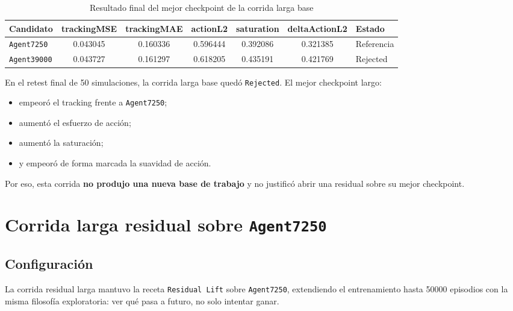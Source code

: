 \documentclass[11pt,a4paper]{article}
\begin{document}
\begin{table}[H]
\centering
\caption{Resultado final del mejor checkpoint de la corrida larga base}
\scriptsize
\begin{tabularx}{\linewidth}{>{\raggedright\arraybackslash}p{1.7cm} c c c c c >{\raggedright\arraybackslash}p{1.8cm}}
\toprule
Candidato & trackingMSE & trackingMAE & actionL2 & saturation & deltaActionL2 & Estado \\
\midrule
\texttt{Agent7250} & 0.043045 & 0.160336 & 0.596444 & 0.392086 & 0.321385 & Referencia \\
\texttt{Agent39000} & 0.043727 & 0.161297 & 0.618205 & 0.435191 & 0.421769 & Rejected \\
\bottomrule
\end{tabularx}
\end{table}

En el retest final de 50 simulaciones, la corrida larga base qued\'o \texttt{Rejected}. El mejor checkpoint largo:
\begin{itemize}
    \item empeor\'o el tracking frente a \texttt{Agent7250};
    \item aument\'o el esfuerzo de acci\'on;
    \item aument\'o la saturaci\'on;
    \item y empeor\'o de forma marcada la suavidad de acci\'on.
\end{itemize}

Por eso, esta corrida \textbf{no produjo una nueva base de trabajo} y no justific\'o abrir una residual sobre su mejor checkpoint.

\section*{Corrida larga residual sobre \texttt{Agent7250}}
\subsection*{Configuraci\'on}
La corrida residual larga mantuvo la receta \texttt{Residual Lift} sobre \texttt{Agent7250}, extendiendo el entrenamiento hasta 50000 episodios con la misma filosof\'ia exploratoria: ver qu\'e pasa a futuro, no solo intentar ganar.
\end{document}
